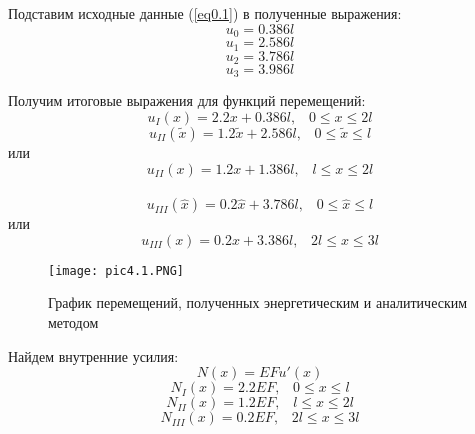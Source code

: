 Подставим исходные данные (\ref{eq0.1}) в полученные выражения:
\begin{equation}
    \label{eq4.16}
    u_0 = 0.386 l
\end{equation}
\begin{equation}
    \label{eq4.17}
    u_1 = 2.586 l
\end{equation}
\begin{equation}
    \label{eq4.18}
    u_2 = 3.786 l
\end{equation}
\begin{equation}
    \label{eq4.18.1}
    u_3 = 3.986 l
\end{equation}

Получим итоговые выражения для функций перемещений:
\begin{equation}
    \label{eq4.19}
    u_I(x) = 2.2x + 0.386l, \;\;\; 0 \leq x \leq 2l
\end{equation}
\begin{equation}
    \label{eq4.20}
    u_{II}(\tilde{x}) = 1.2 \tilde{x} + 2.586 l, \;\;\; 0 \leq \tilde{x} \leq l
\end{equation}
или
\begin{equation}
    \label{eq4.21}
    u_{II}(x) = 1.2x + 1.386 l, \;\;\; l \leq x \leq 2l
\end{equation}\
\begin{equation}
    \label{eq4.21.1}
    u_{III}(\hat{x}) = 0.2 \hat{x} + 3.786 l, \;\;\; 0 \leq \hat{x} \leq l
\end{equation}
или
\begin{equation}
    \label{eq4.21.2}
    u_{III}(x) = 0.2 x + 3.386 l, \;\;\; 2l \leq x \leq 3l
\end{equation}

\begin{figure}[H]
    \begin{center}
        \texttt{[image: pic4.1.PNG]}
        \caption{График перемещений, полученных энергетическим и аналитическим методом}
        \label{pic4.1}
    \end{center}
\end{figure}

Найдем внутренние усилия:
\begin{equation}
    \label{eq4.22}
    N(x) = EFu'(x)
\end{equation}
\begin{equation}
    \label{eq4.23}
    N_I(x) = 2.2 EF, \;\;\; 0 \leq x \leq l
\end{equation}
\begin{equation}
    \label{eq4.24}
    N_{II}(x) = 1.2EF, \;\;\; l \leq x \leq 2l
\end{equation}
\begin{equation}
    \label{eq4.24.1}
    N_{III}(x) = 0.2 EF, \;\;\; 2l \leq x \leq 3l
\end{equation}

